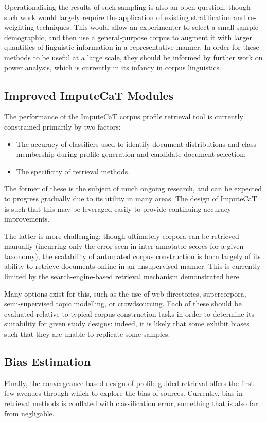 Operationalising the results of such sampling is also an open question, though such work would largely require the application of existing stratification and re-weighting techniques.  This would allow an experimenter to select a small sample demographic, and then use a general-purpose corpus to augment it with larger quantities of linguistic information in a representative manner.  In order for these methods to be useful at a large scale, they should be informed by further work on power analysis, which is currently in its infancy in corpus linguistics.



\subsection{Improved ImputeCaT Modules}
The performance of the ImputeCaT corpus profile retrieval tool is currently constrained primarily by two factors:

\begin{itemize}
    \item The accuracy of classifiers used to identify document distributions and class membership during profile generation and candidate document selection;
    \item The specificity of retrieval methods.
\end{itemize}

The former of these is the subject of much ongoing research, and can be expected to progress gradually due to its utility in many areas.  The design of ImputeCaT is such that this may be leveraged easily to provide continuing accuracy improvements.

The latter is more challenging: though ultimately corpora can be retrieved manually (incurring only the error seen in inter-annotator scores for a given taxonomy\cite{sharoffs2015}), the scalability of automated corpus construction is born largely of its ability to retrieve documents online in an unsupervised manner.  This is currently limited by the search-engine-based retrieval mechanism demonstrated here.

Many options exist for this, such as the use of web directories, supercorpora, semi-supervised topic modelling, or crowdsourcing.  Each of these should be evaluated relative to typical corpus construction tasks in order to determine its suitability for given study designs: indeed, it is likely that some exhibit biases such that they are unable to replicate some samples.


\subsection{Bias Estimation}
Finally, the convergeance-based design of profile-guided retrieval offers the first few avenues through which to explore the bias of sources.  Currently, bias in retrieval methods is conflated with classification error, something that is also far from negligable.

